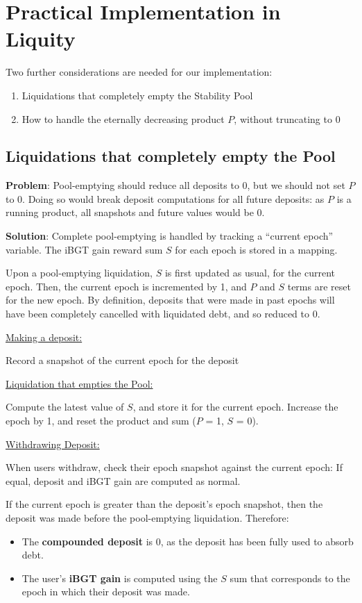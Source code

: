 \documentclass[reqno]{article}
\begin{document}
\section{Practical Implementation in Liquity}
Two further considerations are needed for our implementation:
\begin{enumerate}
    \item Liquidations that completely empty the Stability Pool
    \item How to handle the eternally decreasing product $P$, without truncating to 0
\end{enumerate}

\bigskip
\subsection{Liquidations that completely empty the Pool}

\bigskip
\textbf{Problem}: Pool-emptying should reduce all deposits to 0, but we should not set $P$ to 0. Doing so would break deposit computations for all future deposits: as $P$ is a running product, all snapshots and future values would be 0.

\bigskip
\textbf{Solution}: Complete pool-emptying is handled by tracking a “current epoch” variable. The iBGT gain reward sum $S$ for each epoch is stored in a mapping.

\bigskip
Upon a pool-emptying liquidation, $S$ is first updated as usual, for the current epoch. Then, the current epoch is incremented by 1, and $P$ and $S$ terms are reset for the new epoch. By definition, deposits that were made in past epochs will have been completely cancelled with liquidated debt, and so reduced to 0.

\bigskip
\underline{Making a deposit:}

Record a snapshot of the current epoch for the deposit

\bigskip
\underline{Liquidation that empties the Pool:}

Compute the latest value of $S$, and store it for the current epoch.
Increase the epoch by 1, and reset the product and sum ($P$ = 1, $S$ = 0).

\bigskip
\underline{Withdrawing Deposit:}

When users withdraw, check their epoch snapshot against the current epoch: If equal, deposit and iBGT gain are computed as normal.

\bigskip
If the current epoch is greater than the deposit’s epoch snapshot, then the deposit was made before the pool-emptying liquidation. Therefore:
\begin{itemize}
    \item The \textbf{compounded deposit} is 0, as the deposit has been fully used to absorb debt.
    \item The user’s \textbf{iBGT gain} is computed using the $S$ sum that corresponds to the epoch in which their deposit was made.
\end{itemize}
\end{document}
